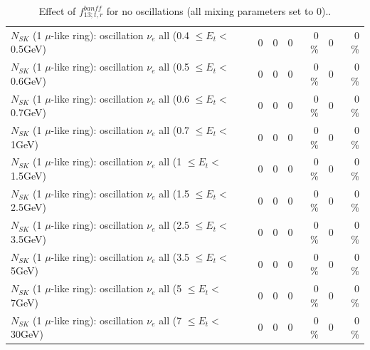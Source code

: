 \begin{table}
\begin{tabular}{| l | r | r | r  r | r  r |}
$N_{SK}$ (1 $\mu$-like ring): oscillation $\nu_{e}$ all (0.4 $\leq E_{t} <$ 0.5GeV) &               0 &               0 &               0 &        0 \%  &               0 &        0 \%  \\ 
$N_{SK}$ (1 $\mu$-like ring): oscillation $\nu_{e}$ all (0.5 $\leq E_{t} <$ 0.6GeV) &               0 &               0 &               0 &        0 \%  &               0 &        0 \%  \\ 
$N_{SK}$ (1 $\mu$-like ring): oscillation $\nu_{e}$ all (0.6 $\leq E_{t} <$ 0.7GeV) &               0 &               0 &               0 &        0 \%  &               0 &        0 \%  \\ 
$N_{SK}$ (1 $\mu$-like ring): oscillation $\nu_{e}$ all (0.7 $\leq E_{t} <$ 1GeV) &               0 &               0 &               0 &        0 \%  &               0 &        0 \%  \\ 
$N_{SK}$ (1 $\mu$-like ring): oscillation $\nu_{e}$ all (1 $\leq E_{t} <$ 1.5GeV) &               0 &               0 &               0 &        0 \%  &               0 &        0 \%  \\ 
$N_{SK}$ (1 $\mu$-like ring): oscillation $\nu_{e}$ all (1.5 $\leq E_{t} <$ 2.5GeV) &               0 &               0 &               0 &        0 \%  &               0 &        0 \%  \\ 
$N_{SK}$ (1 $\mu$-like ring): oscillation $\nu_{e}$ all (2.5 $\leq E_{t} <$ 3.5GeV) &               0 &               0 &               0 &        0 \%  &               0 &        0 \%  \\ 
$N_{SK}$ (1 $\mu$-like ring): oscillation $\nu_{e}$ all (3.5 $\leq E_{t} <$ 5GeV) &               0 &               0 &               0 &        0 \%  &               0 &        0 \%  \\ 
 $N_{SK}$ (1 $\mu$-like ring): oscillation $\nu_{e}$ all (5 $\leq E_{t} <$ 7GeV) &               0 &               0 &               0 &        0 \%  &               0 &        0 \%  \\ 
$N_{SK}$ (1 $\mu$-like ring): oscillation $\nu_{e}$ all (7 $\leq E_{t} <$ 30GeV) &               0 &               0 &               0 &        0 \%  &               0 &        0 \%  \\ 
\hline
\hline
\end{tabular}
\caption{ Effect of $f_{13; t, r}^{banff}$ for no oscillations (all mixing parameters set to 0).. }
\label{tab:num_banff_13_1RmuT_3f_osc_t13:0}
\end{table}
\clearpage
